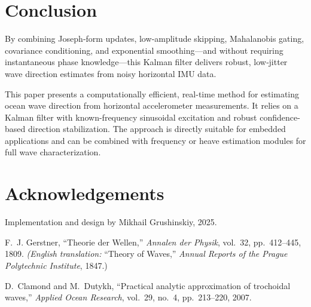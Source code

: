 \documentclass[12pt,letterpaper]{article}
\begin{document}
\section{Conclusion}
By combining Joseph‐form updates, low‐amplitude skipping, Mahalanobis gating, covariance conditioning, and exponential smoothing—and without requiring instantaneous phase knowledge—this Kalman filter delivers robust, low‐jitter wave direction estimates from noisy horizontal IMU data.\par
\vspace{1ex}
\noindent This paper presents a computationally efficient, real-time method for estimating ocean wave direction from horizontal accelerometer measurements. It relies on a Kalman filter with known-frequency sinusoidal excitation and robust confidence-based direction stabilization. The approach is directly suitable for embedded applications and can be combined with frequency or heave estimation modules for full wave characterization.

\section*{Acknowledgements}
Implementation and design by Mikhail Grushinskiy, 2025.

\begin{thebibliography}{9}
F.~J. Gerstner, ``Theorie der Wellen,'' 
\emph{Annalen der Physik}, vol.~32, pp.~412–445, 1809.  
\emph{(English translation: }``Theory of Waves,'' \emph{Annual Reports of the Prague Polytechnic Institute}, 1847.)

D.~Clamond and M.~Dutykh, ``Practical analytic approximation of trochoidal waves,'' 
\emph{Applied Ocean Research}, vol.~29, no.~4, pp.~213–220, 2007.
\end{thebibliography}
\end{document}
